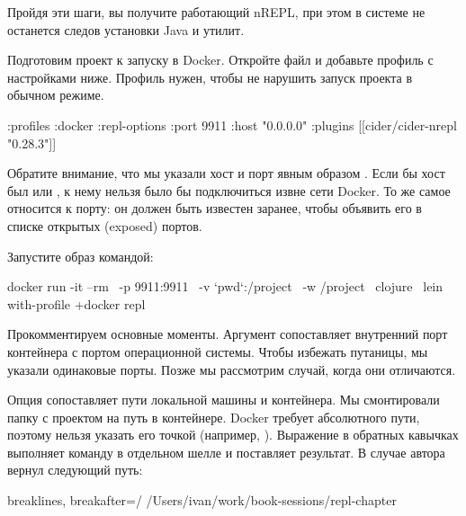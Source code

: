 Пройдя эти шаги, вы получите работающий nREPL, при этом в системе не останется следов установки Java и утилит.

Подготовим проект к запуску в Docker. Откройте файл  и добавьте профиль  с настройками ниже. Профиль нужен, чтобы не нарушить запуск проекта в обычном режиме.

\begin{english}
  \begin{clojure/lines}
:profiles
{:docker
 {:repl-options
   {:port 9911
    :host "0.0.0.0"}
  :plugins [[cider/cider-nrepl "0.28.3"]]}}
  \end{clojure/lines}
\end{english}

Обратите внимание, что мы указали хост и порт явным образом . Если бы хост был  или , к нему нельзя было бы подключиться извне сети Docker. То же самое относится к порту: он должен быть известен заранее, чтобы объявить его в списке открытых (exposed) портов.

Запустите образ командой:

\begin{english}
  \begin{bash/lines}
docker run -it --rm \
  -p 9911:9911 \
  -v `pwd`:/project \
  -w /project \
  clojure \
  lein with-profile +docker repl
  \end{bash/lines}
\end{english}

Прокомментируем основные моменты. Аргумент   сопоставляет внутренний порт контейнера с портом операционной системы. Чтобы избежать путаницы, мы указали одинаковые порты. Позже мы рассмотрим случай, когда они отличаются.

Опция \code{-v}  сопоставляет пути локальной машины и контейнера. Мы смонтировали папку с проектом на путь  в контейнере. Docker требует абсолютного пути, поэтому нельзя указать его точкой (например, ). Выражение  в обратных кавычках выполняет команду в отдельном шелле и поставляет результат. В случае автора  вернул следующий путь:

\begin{english}
  \begin{text*}{breaklines, breakafter=/}
/Users/ivan/work/book-sessions/repl-chapter
  \end{text*}
\end{english}

